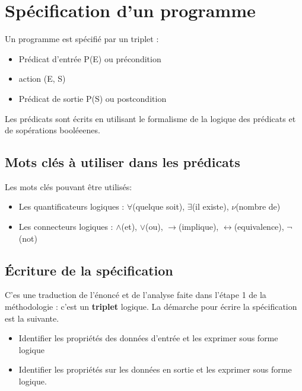 \documentclass[12pt,a4paper,openany]{book}
\begin{document}
	\chapter{Spécification d'un programme}
	Un programme est spécifié par un triplet : 
	\begin{itemize}
		\item Prédicat d'entrée P(E) ou précondition
		\item action (E, S)
		\item Prédicat de sortie P(S) ou postcondition
	\end{itemize}

		Les prédicats sont écrits en utilisant le formalisme de la logique des prédicats et de sopérations booléeenes.
		\section{Mots clés à utiliser dans les prédicats}
		Les mots clés pouvant être utilisés: 
		\begin{itemize}
			\item Les quantificateurs logiques : $\forall$(quelque soit), $\exists$(il existe), $\nu$(nombre de)
			\item Les connecteurs logiques : $\wedge$(et), $\vee$(ou), $\rightarrow$(implique), $\leftrightarrow$(equivalence), $\lnot$(not)
		\end{itemize}
		\section{\'Ecriture de la spécification}
		C'es une traduction de l'énoncé et de l'analyse faite dans l'étape 1 de la méthodologie : c'est un \textbf{triplet} logique.
		La démarche pour écrire la spécification est la suivante.
			\begin{itemize}
				\item Identifier les propriétés des données d'entrée et les exprimer sous forme logique
				\item Identifier les propriétés sur les données en sortie et les exprimer sous forme logique. 
			\end{itemize}
	
\end{document}
